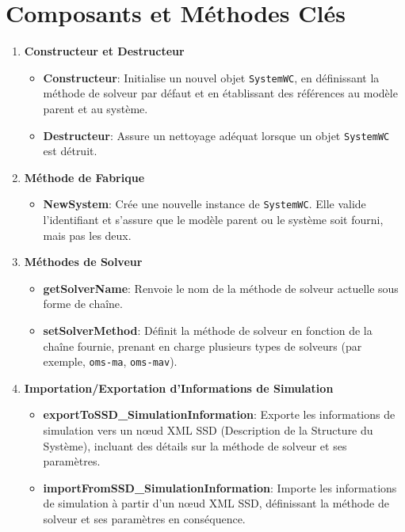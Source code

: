 \section{Composants et Méthodes Clés}

\begin{enumerate}
    \item \textbf{Constructeur et Destructeur}
    \begin{itemize}
        \item \textbf{Constructeur}: Initialise un nouvel objet \texttt{SystemWC}, en définissant la méthode de solveur par défaut et en établissant des références au modèle parent et au système.
        \item \textbf{Destructeur}: Assure un nettoyage adéquat lorsque un objet \texttt{SystemWC} est détruit.
    \end{itemize}

    \item \textbf{Méthode de Fabrique}
    \begin{itemize}
        \item \textbf{NewSystem}: Crée une nouvelle instance de \texttt{SystemWC}. Elle valide l'identifiant et s'assure que le modèle parent ou le système soit fourni, mais pas les deux.
    \end{itemize}

    \item \textbf{Méthodes de Solveur}
    \begin{itemize}
        \item \textbf{getSolverName}: Renvoie le nom de la méthode de solveur actuelle sous forme de chaîne.
        \item \textbf{setSolverMethod}: Définit la méthode de solveur en fonction de la chaîne fournie, prenant en charge plusieurs types de solveurs (par exemple, \texttt{oms-ma}, \texttt{oms-mav}).
    \end{itemize}

    \item \textbf{Importation/Exportation d'Informations de Simulation}
    \begin{itemize}
        \item \textbf{exportToSSD\_SimulationInformation}: Exporte les informations de simulation vers un nœud XML SSD (Description de la Structure du Système), incluant des détails sur la méthode de solveur et ses paramètres.
        \item \textbf{importFromSSD\_SimulationInformation}: Importe les informations de simulation à partir d'un nœud XML SSD, définissant la méthode de solveur et ses paramètres en conséquence.
    \end{itemize}


\end{enumerate}

